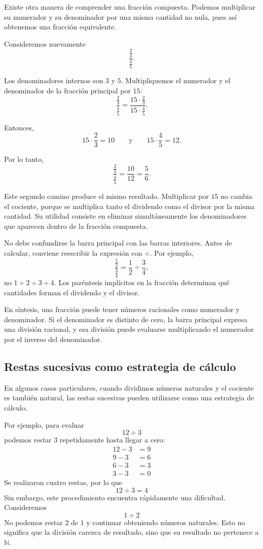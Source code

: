 Existe otra manera de comprender una fracción compuesta. Podemos multiplicar
su numerador y su denominador por una misma cantidad no nula, pues así obtenemos
una fracción equivalente.

Consideremos nuevamente
\[
\frac{\frac23}{\frac45}.
\]

Los denominadores internos son \(3\) y \(5\). Multipliquemos el numerador y el
denominador de la fracción principal por \(15\):
\[
\frac{\frac23}{\frac45}
=
\frac{15\cdot\frac23}{15\cdot\frac45}.
\]

Entonces,
\[
15\cdot\frac23=10
\qquad\text{y}\qquad
15\cdot\frac45=12.
\]

Por lo tanto,
\[
\frac{\frac23}{\frac45}
=
\frac{10}{12}
=
\frac56.
\]

Este segundo camino produce el mismo resultado. Multiplicar por \(15\) no
cambia el cociente, porque se multiplica tanto el dividendo como el divisor por
la misma cantidad. Su utilidad consiste en eliminar simultáneamente los
denominadores que aparecen dentro de la fracción compuesta.

\begin{note}
No debe confundirse la barra principal con las barras interiores. Antes de
calcular, conviene reescribir la expresión con \(\div\). Por ejemplo,
\[
\frac{\frac12}{\frac34}
=
\frac12\div\frac34,
\]
no \(1\div2\div3\div4\). Los paréntesis implícitos en la fracción determinan
qué cantidades forman el dividendo y el divisor.
\end{note}

En síntesis, una fracción puede tener números racionales como numerador y
denominador. Si el denominador es distinto de cero, la barra principal expresa
una división racional, y esa división puede evaluarse multiplicando el
numerador por el inverso del denominador.

\subsection{Restas sucesivas como estrategia de cálculo}

En algunos casos particulares, cuando dividimos números naturales y el cociente es también natural, las restas sucesivas pueden utilizarse como una estrategia de cálculo.

Por ejemplo, para evaluar
\[
12\div3
\]
podemos restar \(3\) repetidamente hasta llegar a cero:
\begin{align*}
12-3&=9\\
9-3&=6\\
6-3&=3\\
3-3&=0
\end{align*}
Se realizaron cuatro restas, por lo que
\[
12\div3=4
\]
Sin embargo, este procedimiento encuentra rápidamente una dificultad. Consideremos
\[
1\div2
\]
No podemos restar \(2\) de \(1\) y continuar obteniendo números naturales. Esto no significa que la división carezca de resultado, sino que su resultado no pertenece a \(\mathbb N\).

